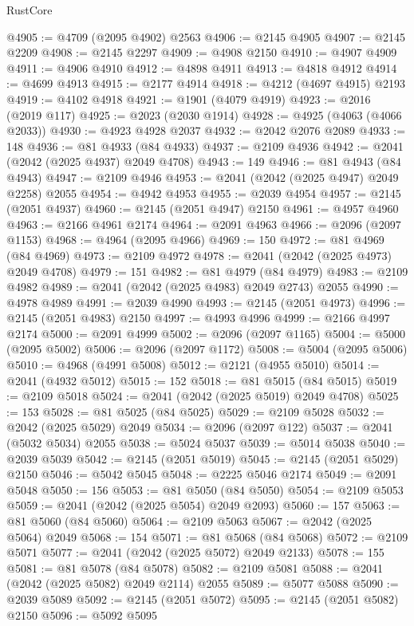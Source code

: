 \begin{lexlean}{RustCore}
\begin{coremodule}
@4905 := @4709 (@2095 @4902) @2563
@4906 := @2145 @4905
@4907 := @2145 @2209
@4908 := @2145 @2297
@4909 := @4908 @2150
@4910 := @4907 @4909
@4911 := @4906 @4910
@4912 := @4898 @4911
@4913 := @4818 @4912
@4914 := @4699 @4913
@4915 := @2177 @4914
@4918 := @4212 (@4697 @4915) @2193
@4919 := @4102 @4918
@4921 := @1901 (@4079 @4919)
@4923 := @2016 (@2019 @117)
@4925 := @2023 (@2030 @1914)
@4928 := @4925 (@4063 (@4066 @2033))
@4930 := @4923 @4928 @2037
@4932 := @2042 @2076 @2089
@4933 := 148
@4936 := @81 @4933 (@84 @4933)
@4937 := @2109 @4936
@4942 := @2041 (@2042 (@2025 @4937) @2049 @4708)
@4943 := 149
@4946 := @81 @4943 (@84 @4943)
@4947 := @2109 @4946
@4953 := @2041 (@2042 (@2025 @4947) @2049 @2258) @2055
@4954 := @4942 @4953
@4955 := @2039 @4954
@4957 := @2145 (@2051 @4937)
@4960 := @2145 (@2051 @4947) @2150
@4961 := @4957 @4960
@4963 := @2166 @4961 @2174
@4964 := @2091 @4963
@4966 := @2096 (@2097 @1153)
@4968 := @4964 (@2095 @4966)
@4969 := 150
@4972 := @81 @4969 (@84 @4969)
@4973 := @2109 @4972
@4978 := @2041 (@2042 (@2025 @4973) @2049 @4708)
@4979 := 151
@4982 := @81 @4979 (@84 @4979)
@4983 := @2109 @4982
@4989 := @2041 (@2042 (@2025 @4983) @2049 @2743) @2055
@4990 := @4978 @4989
@4991 := @2039 @4990
@4993 := @2145 (@2051 @4973)
@4996 := @2145 (@2051 @4983) @2150
@4997 := @4993 @4996
@4999 := @2166 @4997 @2174
@5000 := @2091 @4999
@5002 := @2096 (@2097 @1165)
@5004 := @5000 (@2095 @5002)
@5006 := @2096 (@2097 @1172)
@5008 := @5004 (@2095 @5006)
@5010 := @4968 (@4991 @5008)
@5012 := @2121 (@4955 @5010)
@5014 := @2041 (@4932 @5012)
@5015 := 152
@5018 := @81 @5015 (@84 @5015)
@5019 := @2109 @5018
@5024 := @2041 (@2042 (@2025 @5019) @2049 @4708)
@5025 := 153
@5028 := @81 @5025 (@84 @5025)
@5029 := @2109 @5028
@5032 := @2042 (@2025 @5029) @2049
@5034 := @2096 (@2097 @122)
@5037 := @2041 (@5032 @5034) @2055
@5038 := @5024 @5037
@5039 := @5014 @5038
@5040 := @2039 @5039
@5042 := @2145 (@2051 @5019)
@5045 := @2145 (@2051 @5029) @2150
@5046 := @5042 @5045
@5048 := @2225 @5046 @2174
@5049 := @2091 @5048
@5050 := 156
@5053 := @81 @5050 (@84 @5050)
@5054 := @2109 @5053
@5059 := @2041 (@2042 (@2025 @5054) @2049 @2093)
@5060 := 157
@5063 := @81 @5060 (@84 @5060)
@5064 := @2109 @5063
@5067 := @2042 (@2025 @5064) @2049
@5068 := 154
@5071 := @81 @5068 (@84 @5068)
@5072 := @2109 @5071
@5077 := @2041 (@2042 (@2025 @5072) @2049 @2133)
@5078 := 155
@5081 := @81 @5078 (@84 @5078)
@5082 := @2109 @5081
@5088 := @2041 (@2042 (@2025 @5082) @2049 @2114) @2055
@5089 := @5077 @5088
@5090 := @2039 @5089
@5092 := @2145 (@2051 @5072)
@5095 := @2145 (@2051 @5082) @2150
@5096 := @5092 @5095

\end{coremodule}
\end{lexlean}
